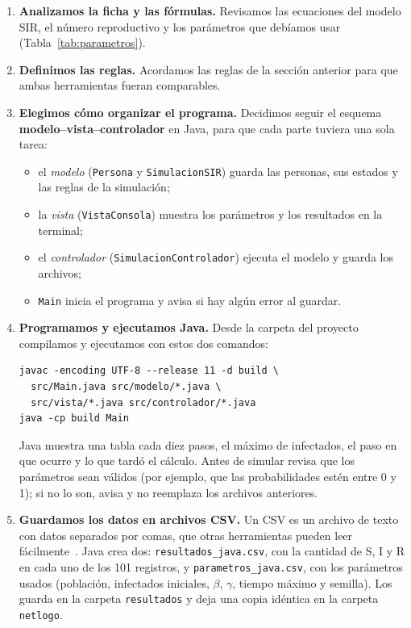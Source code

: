 \documentclass[11pt,a4paper]{article}
\begin{document}
\begin{enumerate}
  \item \textbf{Analizamos la ficha y las fórmulas.} Revisamos las ecuaciones del modelo SIR, el número reproductivo y los parámetros que debíamos usar (Tabla~\ref{tab:parametros}).

  \item \textbf{Definimos las reglas.} Acordamos las reglas de la sección anterior para que ambas herramientas fueran comparables.

  \item \textbf{Elegimos cómo organizar el programa.} Decidimos seguir el esquema \textbf{modelo--vista--controlador} en Java, para que cada parte tuviera una sola tarea:
  \begin{itemize}
    \item el \emph{modelo} (\texttt{Persona} y \texttt{SimulacionSIR}) guarda las personas, sus estados y las reglas de la simulación;
    \item la \emph{vista} (\texttt{VistaConsola}) muestra los parámetros y los resultados en la terminal;
    \item el \emph{controlador} (\texttt{SimulacionControlador}) ejecuta el modelo y guarda los archivos;
    \item \texttt{Main} inicia el programa y avisa si hay algún error al guardar.
  \end{itemize}

  \item \textbf{Programamos y ejecutamos Java.} Desde la carpeta del proyecto compilamos y ejecutamos con estos dos comandos:
{\small
\begin{verbatim}
javac -encoding UTF-8 --release 11 -d build \
  src/Main.java src/modelo/*.java \
  src/vista/*.java src/controlador/*.java
java -cp build Main
\end{verbatim}
}
  Java muestra una tabla cada diez pasos, el máximo de infectados, el paso en que ocurre y lo que tardó el cálculo. Antes de simular revisa que los parámetros sean válidos (por ejemplo, que las probabilidades estén entre 0 y 1); si no lo son, avisa y no reemplaza los archivos anteriores.

  \item \textbf{Guardamos los datos en archivos CSV.} Un CSV es un archivo de texto con datos separados por comas, que otras herramientas pueden leer fácilmente~\cite{csv}. Java crea dos: \texttt{resultados\_java.csv}, con la cantidad de S, I y R en cada uno de los 101 registros, y \texttt{parametros\_java.csv}, con los parámetros usados (población, infectados iniciales, $\beta$, $\gamma$, tiempo máximo y semilla). Los guarda en la carpeta \texttt{resultados} y deja una copia idéntica en la carpeta \texttt{netlogo}.


\end{enumerate}
\end{document}
